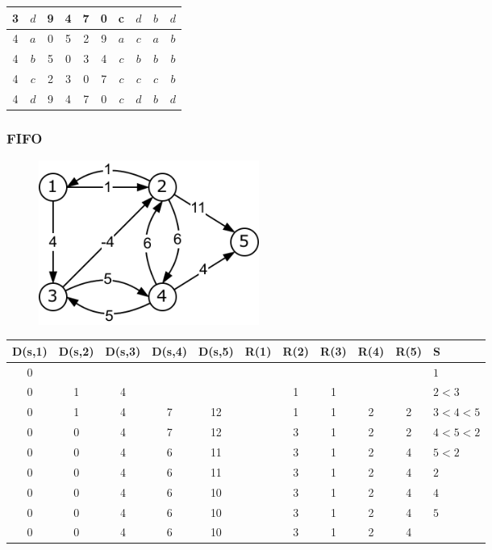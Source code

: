 \begin{table}[h]
\begin{tabular}{c|c|cccc|cccc}
3 & $d$ & {\color{blue}9} & 4 & {\color{red}7} & 0  & {\color{blue}c} & $d$ & $b$ & $d$\\
\hline
4 & $a$ & 0 & 5 & 2 & {\color{red}9} & $a$ & $c$ & $a$ & $b$\\ 
4 & $b$ & 5 & 0 & 3 & {\color{red}4} & $c$ & $b$ & $b$ & $b$\\
4 & $c$ & 2 & 3 & 0 & {\color{red}7} & $c$ & $c$ & $c$ & $b$\\
4 & $d$ & {\color{red}9} & {\color{red}4} & {\color{red}7} & {\color{red}0} & {\color{red}$c$} & {\color{red}$d$} & {\color{red}$b$} & {\color{red}$d$}\\
\end{tabular}
\end{table}

\newpage

\subsubsection*{FIFO}

\begin{figure}[h]
\centering
\includegraphics[width=0.35\textwidth]{graphics/fifo.png}
\end{figure}

\begin{table}[h]
\centering
\begin{tabular}{c|c|c|c|c||c|c|c|c|c||l}
D(s,1) & D(s,2) & D(s,3) & D(s,4) & D(s,5) & R(1) & R(2) & R(3) & R(4) & R(5) & S\\
\hline
0 &   &   &   &    & &   &   &   &   & $1$\\
0 & 1 & 4 &   &    & & 1 & 1 &   &   & $2 < 3$\\
0 & 1 & 4 & 7 & 12 & & 1 & 1 & 2 & 2 & $3 < 4 < 5$\\
0 & 0 & 4 & 7 & 12 & & 3 & 1 & 2 & 2 & $4 < 5 < 2$\\
0 & 0 & 4 & 6 & 11 & & 3 & 1 & 2 & 4 & $5 < 2$\\
0 & 0 & 4 & 6 & 11 & & 3 & 1 & 2 & 4 & $2$\\
0 & 0 & 4 & 6 & 10 & & 3 & 1 & 2 & 4 & $4$\\
0 & 0 & 4 & 6 & 10 & & 3 & 1 & 2 & 4 & $5$\\
0 & 0 & 4 & 6 & 10 & & 3 & 1 & 2 & 4 &
\end{tabular}
\end{table}
